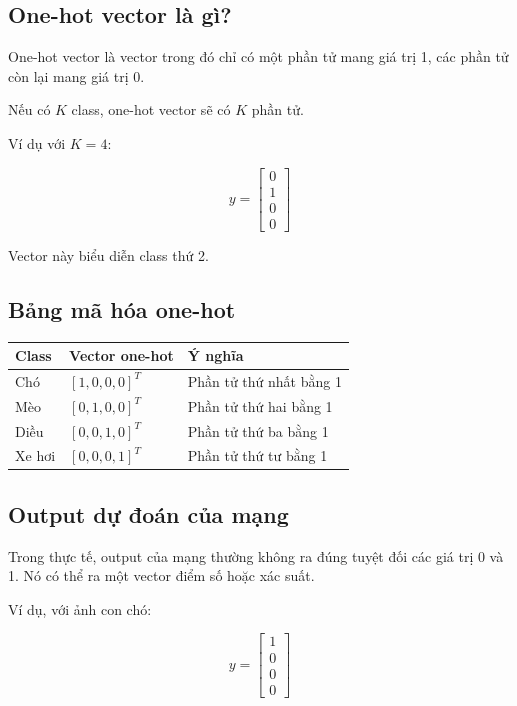 \subsection{One-hot vector là gì?}

One-hot vector là vector trong đó chỉ có một phần tử mang giá trị 1, các phần tử còn lại mang giá trị 0.

Nếu có $K$ class, one-hot vector sẽ có $K$ phần tử.

Ví dụ với $K=4$:

\[
    y =
    \begin{bmatrix}
    0\\
    1\\
    0\\
    0
    \end{bmatrix}
\]

Vector này biểu diễn class thứ 2.

\subsection{Bảng mã hóa one-hot}

\begin{center}
\begin{tabular}{lll}
\toprule
Class & Vector one-hot & Ý nghĩa \\
\midrule
Chó & $[1,0,0,0]^T$ & Phần tử thứ nhất bằng 1 \\
Mèo & $[0,1,0,0]^T$ & Phần tử thứ hai bằng 1 \\
Diều & $[0,0,1,0]^T$ & Phần tử thứ ba bằng 1 \\
Xe hơi & $[0,0,0,1]^T$ & Phần tử thứ tư bằng 1 \\
\bottomrule
\end{tabular}
\end{center}

\subsection{Output dự đoán của mạng}

Trong thực tế, output của mạng thường không ra đúng tuyệt đối các giá trị 0 và 1. Nó có thể ra một vector điểm số hoặc xác suất.

Ví dụ, với ảnh con chó:

\[
    y =
    \begin{bmatrix}
    1\\0\\0\\0
    \end{bmatrix}
\]

